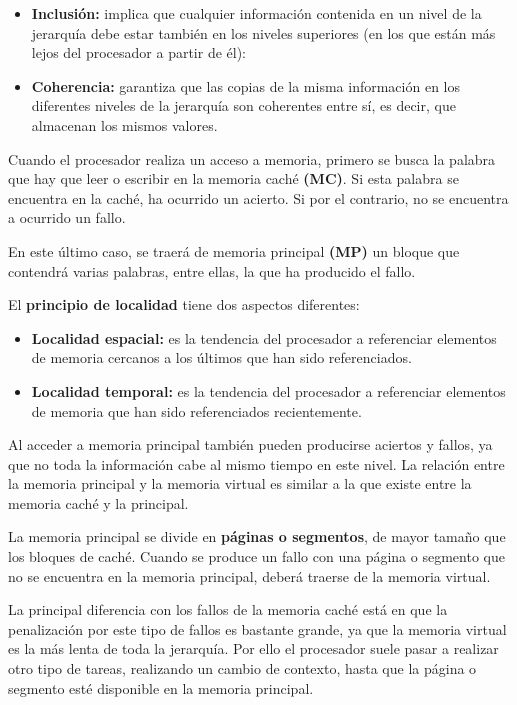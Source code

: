 \begin{itemize}
  \item \textbf{Inclusión:} implica que cualquier información contenida en un nivel de la jerarquía debe estar también en los niveles superiores (en los que están más lejos del procesador a partir de él):
  \item \textbf{Coherencia:} garantiza que las copias de la misma información en los diferentes niveles de la jerarquía son coherentes entre sí, es decir, que almacenan los mismos valores.
\end{itemize}

Cuando el procesador realiza un acceso a memoria, primero se busca la palabra que hay que leer o escribir en la memoria caché \textbf{(MC)}. Si esta palabra se encuentra en la caché, ha ocurrido un acierto. Si por el contrario, no se encuentra a ocurrido un fallo.

En este último caso, se traerá de memoria principal \textbf{(MP)} un bloque que contendrá varias palabras, entre ellas, la que ha producido el fallo.

El \textbf{principio de localidad} tiene dos aspectos diferentes:

\begin{itemize}
  \item \textbf{Localidad espacial:} es la tendencia del procesador a referenciar elementos de memoria cercanos a los últimos que han sido referenciados.
  \item \textbf{Localidad temporal:} es la tendencia del procesador a referenciar elementos de memoria que han sido referenciados recientemente.
\end{itemize}

Al acceder a memoria principal también pueden producirse aciertos y fallos, ya que no toda la información cabe al mismo tiempo en este nivel. La relación entre la memoria principal y la memoria virtual es similar a la que existe entre la memoria caché y la principal.

La memoria principal se divide en \textbf{páginas o segmentos}, de mayor tamaño que los bloques de caché. Cuando se produce un fallo con una página o segmento que no se encuentra en la memoria principal, deberá traerse de la memoria virtual.

La principal diferencia con los fallos de la memoria caché está en que la penalización por este tipo de fallos es bastante grande, ya que la memoria virtual es la más lenta de toda la jerarquía. Por ello el procesador suele pasar a  realizar otro tipo de tareas, realizando un cambio de contexto, hasta que la página o segmento esté disponible en la memoria principal.

